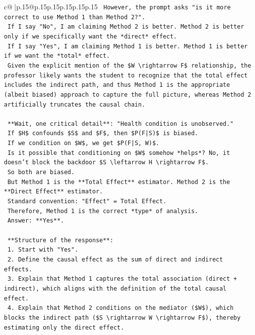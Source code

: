 \documentclass{article}
\begin{document}
{\begin{supertabular}{c@{$\;$}|p{.15\linewidth}@{}p{.15\linewidth}p{.15\linewidth}p{.15\linewidth}p{.15\linewidth}p{.15\linewidth}}
{{{\texttt{    However, the prompt asks "is it more correct to use Method 1 than Method 2?".} \\
\texttt{    If I say "No", I am claiming Method 2 is better. Method 2 is better only if we specifically want the *direct* effect.} \\
\texttt{    If I say "Yes", I am claiming Method 1 is better. Method 1 is better if we want the *total* effect.} \\
\texttt{    Given the explicit mention of the \$W \textbackslash{}rightarrow F\$ relationship, the professor likely wants the student to recognize that the total effect includes the indirect path, and thus Method 1 is the appropriate (albeit biased) approach to capture the full picture, whereas Method 2 artificially truncates the causal chain.} \\
\\ 
\texttt{    **Wait, one critical detail**: "Health condition is unobserved."} \\
\texttt{    If \$H\$ confounds \$S\$ and \$F\$, then \$P(F|S)\$ is biased.} \\
\texttt{    If we condition on \$W\$, we get \$P(F|S, W)\$.} \\
\texttt{    Is it possible that conditioning on \$W\$ somehow *helps*? No, it doesn't block the backdoor \$S \textbackslash{}leftarrow H \textbackslash{}rightarrow F\$.} \\
\texttt{    So both are biased.} \\
\texttt{    But Method 1 is the **Total Effect** estimator. Method 2 is the **Direct Effect** estimator.} \\
\texttt{    Standard convention: "Effect" = Total Effect.} \\
\texttt{    Therefore, Method 1 is the correct *type* of analysis.} \\
\texttt{    Answer: **Yes**.} \\
\\ 
\texttt{    **Structure of the response**:} \\
\texttt{    1.  Start with "Yes".} \\
\texttt{    2.  Define the causal effect as the sum of direct and indirect effects.} \\
\texttt{    3.  Explain that Method 1 captures the total association (direct + indirect), which aligns with the definition of the total causal effect.} \\
\texttt{    4.  Explain that Method 2 conditions on the mediator (\$W\$), which blocks the indirect path (\$S \textbackslash{}rightarrow W \textbackslash{}rightarrow F\$), thereby estimating only the direct effect.} \\
}}}
\end{supertabular}}
\end{document}
